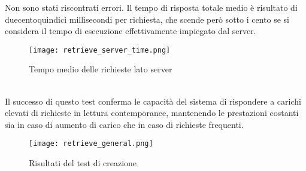 Non sono stati riscontrati errori.
Il tempo di risposta totale medio è risultato di duecentoquindici millisecondi per richiesta,
che scende però sotto i cento se si considera il tempo di esecuzione effettivamente impiegato dal server.\\
\begin{figure}[htbp]
    \begin{center}
        \texttt{[image: retrieve\_server\_time.png]}
        \caption{Tempo medio delle richieste lato server}
    \end{center}
\end{figure}
\\
Il successo di questo test conferma le capacità del sistema 
di rispondere a carichi elevati di richieste in lettura contemporanee, 
mantenendo le prestazioni costanti sia in caso di aumento di carico che in caso di richieste frequenti.\\
\begin{figure}[htbp]
    \begin{center}
        \texttt{[image: retrieve\_general.png]}
        \caption{Risultati del test di creazione}
    \end{center}
\end{figure}
\clearpage

